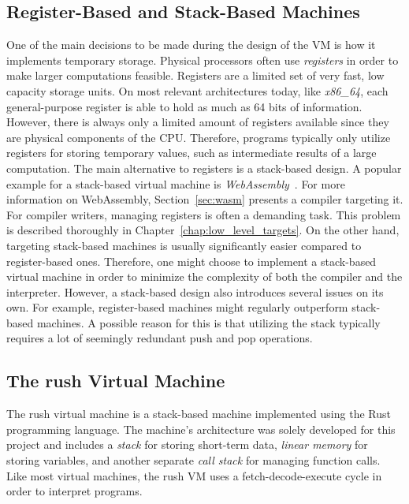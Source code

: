 \subsection{Register-Based and Stack-Based Machines}

One of the main decisions to be made during the design of the VM is how it implements temporary storage.
Physical processors often use \emph{registers} in order to make larger computations feasible.
Registers are a limited set of very fast, low capacity storage units.
On most relevant architectures today, like \emph{x86\_64}, each general-purpose register is able to hold as much as 64 bits of information.
However, there is always only a limited amount of registers available since they are physical components of the CPU\@.
Therefore, programs typically only utilize registers for storing temporary values, such as intermediate results of a large computation.
The main alternative to registers is a stack-based design.
A popular example for a stack-based virtual machine is \emph{WebAssembly}~\cite[p.~44]{Sendil2022-fy}.
For more information on WebAssembly, Section~\ref{sec:wasm} presents a compiler targeting it.
For compiler writers, managing registers is often a demanding task.
This problem is described thoroughly in Chapter~\ref{chap:low_level_targets}.
On the other hand, targeting stack-based machines is usually significantly easier compared to register-based ones.
Therefore, one might choose to implement a stack-based virtual machine in order to minimize the complexity of both the compiler and the interpreter.
However, a stack-based design also introduces several issues on its own.
For example, register-based machines might regularly outperform stack-based machines.
A possible reason for this is that utilizing the stack typically requires a lot of seemingly redundant push and pop operations.

\subsection{The rush Virtual Machine}

The rush virtual machine is a stack-based machine implemented using the Rust programming language.
The machine's architecture was solely developed for this project and includes a \emph{stack} for storing short-term data, \emph{linear memory} for storing variables, and another separate \emph{call stack} for managing function calls.
Like most virtual machines, the rush VM uses a fetch-decode-execute cycle in order to interpret programs.

